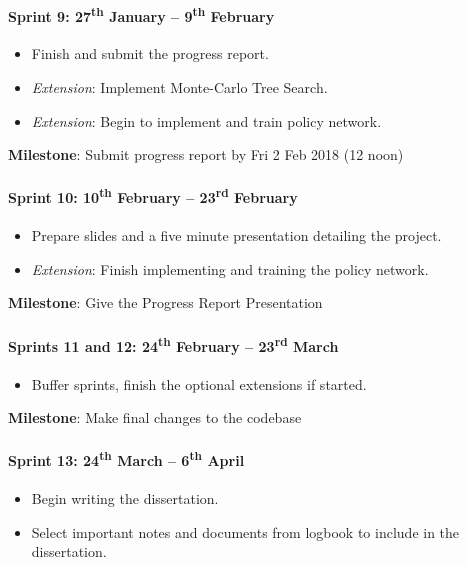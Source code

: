 \documentclass[12pt,a4paper]{book}
\begin{document}
\paragraph{Sprint 9: 27\textsuperscript{th} January -- 9\textsuperscript{th} February}
\begin{itemize}
\item Finish and submit the progress report.
\item \textit{Extension}: Implement Monte-Carlo Tree Search.
\item \textit{Extension}: Begin to implement and train policy network.
\end{itemize}

\textbf{Milestone}: Submit progress report by Fri 2 Feb 2018 (12 noon)

\paragraph{Sprint 10: 10\textsuperscript{th} February -- 23\textsuperscript{rd} February}
\begin{itemize}
\item Prepare slides and a five minute presentation detailing the project.
\item \textit{Extension}: Finish implementing and training the policy network.
\end{itemize}

\textbf{Milestone}: Give the Progress Report Presentation

\paragraph{Sprints 11 and 12: 24\textsuperscript{th} February -- 23\textsuperscript{rd} March}
\begin{itemize}
\item Buffer sprints, finish the optional extensions if started.
\end{itemize}

\textbf{Milestone}: Make final changes to the codebase

\paragraph{Sprint 13: 24\textsuperscript{th} March -- 6\textsuperscript{th} April}
\begin{itemize}
\item Begin writing the dissertation.
\item Select important notes and documents from logbook to include in the dissertation.
\end{itemize}
\end{document}
